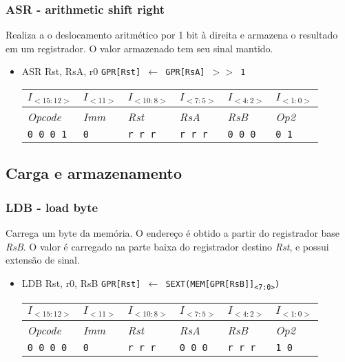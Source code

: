 \documentclass{extreport}
\begin{document}
\subsubsection{ASR - arithmetic shift right}
Realiza a o deslocamento aritmético por 1 bit à direita e armazena o resultado em um registrador. O valor armazenado tem seu sinal mantido.

\begin{itemize}
\item ASR Rst, RsA, r0
\subitem \texttt{GPR[Rst] $\leftarrow$ GPR[RsA] $>>$ 1}
\begin{table}[ht!]
\centering
\begin{tabular}{|p{1.6cm}|p{1.6cm}|p{1.6cm}|p{1.6cm}|p{1.6cm}|p{1.6cm}|}
\hline
$I_{<15:12>}$ & $I_{<11>}$ & $I_{<10:8>}$ & $I_{<7:5>}$ & $I_{<4:2>}$ & $I_{<1:0>}$ \\ \hline
\textit{Opcode} & \textit{Imm} & \textit{Rst} & \textit{RsA} & \textit{RsB} & \textit{Op2} \\ \hline
\texttt{0 0 0 1} & \texttt{0} & \texttt{r r r} & \texttt{r r r} & \texttt{0 0 0} & \texttt{0 1} \\ \hline
\end{tabular}
\end{table}
\end{itemize}

\subsection{Carga e armazenamento}
\subsubsection{LDB - load byte}
Carrega um byte da memória. O endereço é obtido a partir do registrador base \textit{RsB}. O valor é carregado na parte baixa do registrador destino \textit{Rst}, e possui extensão de sinal.

\begin{itemize}
\item LDB Rst, r0, RsB
\subitem \texttt{GPR[Rst] $\leftarrow$ SEXT(MEM[GPR[RsB]]\textsubscript{<7:0>})}
\begin{table}[ht!]
\centering
\begin{tabular}{|p{1.6cm}|p{1.6cm}|p{1.6cm}|p{1.6cm}|p{1.6cm}|p{1.6cm}|}
\hline
$I_{<15:12>}$ & $I_{<11>}$ & $I_{<10:8>}$ & $I_{<7:5>}$ & $I_{<4:2>}$ & $I_{<1:0>}$ \\ \hline
\textit{Opcode} & \textit{Imm} & \textit{Rst} & \textit{RsA} & \textit{RsB} & \textit{Op2} \\ \hline
\texttt{0 0 0 0} & \texttt{0} & \texttt{r r r} & \texttt{0 0 0} & \texttt{r r r} & \texttt{1 0} \\ \hline
\end{tabular}
\end{table}
\end{itemize}
\end{document}
